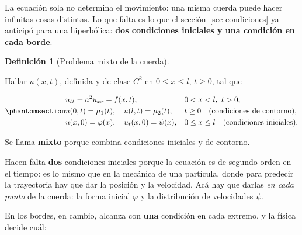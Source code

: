 \documentclass[
  spanish,
  a4paper,
]{scrbook}
\theoremstyle{definition}
\newtheorem{definition}{Definición}[chapter]
\theoremstyle{plain}
\theoremstyle{definition}
\theoremstyle{plain}
\theoremstyle{definition}
\theoremstyle{remark}
\begin{document}
La ecuación sola no determina el movimiento: una misma cuerda puede
hacer infinitas cosas distintas. Lo que falta es lo que el
sección~\ref{sec-condiciones} ya anticipó para una hiperbólica:
\textbf{dos condiciones iniciales y una condición en cada borde}.

\begin{definition}[Problema mixto de la
cuerda]\protect\hypertarget{def-hip-problema-mixto}{}\label{def-hip-problema-mixto}

Hallar \(u(x,t)\), definida y de clase \(C^2\) en \(0\le x\le l\),
\(t\ge 0\), tal que

\begin{equation}\protect\phantomsection\label{eq-hip-mixto}{
\begin{aligned}
&u_{tt} = a^2u_{xx} + f(x,t), && 0<x<l,\ t>0, \\
&u(0,t) = \mu_1(t),\quad u(l,t) = \mu_2(t), && t\ge 0 \quad\text{(condiciones de contorno)},\\
&u(x,0) = \varphi(x),\quad u_t(x,0) = \psi(x), && 0\le x\le l \quad\text{(condiciones iniciales)}.
\end{aligned}
}\end{equation}

Se llama \textbf{mixto} porque combina condiciones iniciales y de
contorno.

\end{definition}

Hacen falta \textbf{dos} condiciones iniciales porque la ecuación es de
segundo orden en el tiempo: es lo mismo que en la mecánica de una
partícula, donde para predecir la trayectoria hay que dar la posición y
la velocidad. Acá hay que darlas \emph{en cada punto} de la cuerda: la
forma inicial \(\varphi\) y la distribución de velocidades \(\psi\).

En los bordes, en cambio, alcanza con \textbf{una} condición en cada
extremo, y la física decide cuál:
\end{document}
